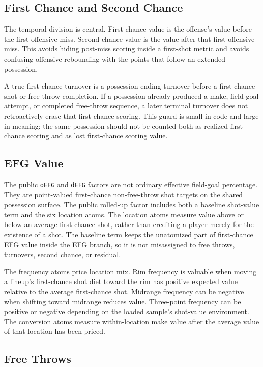 \documentclass[11pt]{article}
\begin{document}
\subsection{First Chance and Second Chance}

The temporal division is central.  First-chance value is the offense's value
before the first offensive miss.  Second-chance value is the value after that
first offensive miss.  This avoids hiding post-miss scoring inside a first-shot
metric and avoids confusing offensive rebounding with the points that follow an
extended possession.

A true first-chance turnover is a possession-ending turnover before a
first-chance shot or free-throw completion.  If a possession already produced a
make, field-goal attempt, or completed free-throw sequence, a later terminal
turnover does not retroactively erase that first-chance scoring.  This guard is
small in code and large in meaning: the same possession should not be counted
both as realized first-chance scoring and as lost first-chance scoring value.

\subsection{EFG Value}

The public \texttt{oEFG} and \texttt{dEFG} factors are not ordinary effective
field-goal percentage.  They are point-valued first-chance non-free-throw shot
targets on the shared possession surface.  The public rolled-up factor includes
both a baseline shot-value term and the six location atoms.  The location atoms
measure value above or below an average first-chance shot, rather than crediting
a player merely for the existence of a shot.  The baseline term keeps the
unatomized part of first-chance EFG value inside the EFG branch, so it is not
misassigned to free throws, turnovers, second chance, or residual.

The frequency atoms price location mix.  Rim frequency is valuable when moving a
lineup's first-chance shot diet toward the rim has positive expected value
relative to the average first-chance shot.  Midrange frequency can be negative
when shifting toward midrange reduces value.  Three-point frequency can be
positive or negative depending on the loaded sample's shot-value environment.
The conversion atoms measure within-location make value after the average value
of that location has been priced.

\subsection{Free Throws}
\end{document}
